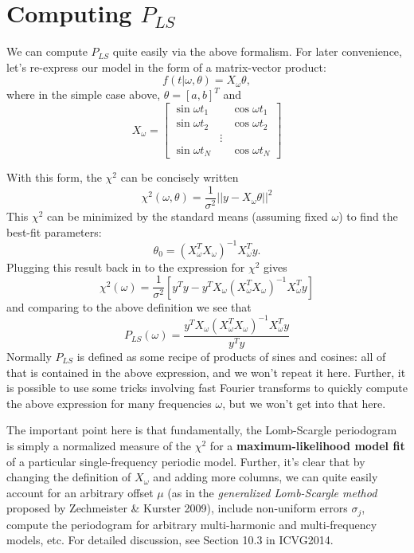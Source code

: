 \documentclass[12pt,pdftex]{article}
\begin{document}
\section{Computing $P_{LS}$}
We can compute $P_{LS}$ quite easily via the above formalism.
For later convenience, let's re-express our model in the form of a matrix-vector product:
\begin{equation}
  f(t|\omega, \theta) = X_\omega \theta,
\end{equation}
where in the simple case above, $\theta = [a, b]^T$ and
\begin{equation}
  X_\omega = \left[\begin{array}{lll}
    \sin\omega t_1 && \cos\omega t_1\\
    \sin\omega t_2 && \cos\omega t_2\\
     & \vdots &\\
    \sin\omega t_N && \cos\omega t_N
  \end{array}\right]
\end{equation}

With this form, the $\chi^2$ can be concisely written
\begin{equation}
\chi^2(\omega, \theta) = \frac{1}{\sigma^2}||y - X_\omega \theta||^2
\end{equation}
This $\chi^2$ can be minimized by the standard means (assuming fixed $\omega$) to find the best-fit parameters:
\begin{equation}
\label{eq:thetaML}
  \theta_0 = (X_\omega^TX_\omega)^{-1}X_\omega^Ty.
\end{equation}
Plugging this result back in to the expression for $\chi^2$ gives
\begin{equation}
\label{eq:chi2}
  \chi^2(\omega) = \frac{1}{\sigma^2}\left[
    y^Ty - y^TX_\omega(X_\omega^TX_\omega)^{-1}X_\omega^Ty
    \right]
\end{equation}
and comparing to the above definition we see that
\begin{equation}
  P_{LS}(\omega) = \frac{y^TX_\omega(X_\omega^TX_\omega)^{-1}X_\omega^Ty}{y^Ty}
\end{equation}
Normally $P_{LS}$ is defined as some recipe of products of sines and cosines: all of that is contained in the above expression, and we won't repeat it here. Further, it is possible to use some tricks involving fast Fourier transforms to quickly compute the above expression for many frequencies $\omega$, but we won't get into that here.

The important point here is that fundamentally, the Lomb-Scargle periodogram is simply a normalized measure of the $\chi^2$ for a {\bf maximum-likelihood model fit} of a particular single-frequency periodic model. Further, it's clear that by changing the definition of $X_\omega$ and adding more columns, we can quite easily account for an arbitrary offset $\mu$ (as in the {\it generalized Lomb-Scargle method} proposed by Zechmeister \& Kurster 2009), include non-uniform errors $\sigma_j$, compute the periodogram for arbitrary multi-harmonic and multi-frequency models, etc. For detailed discussion, see Section 10.3 in ICVG2014. 
\end{document}
